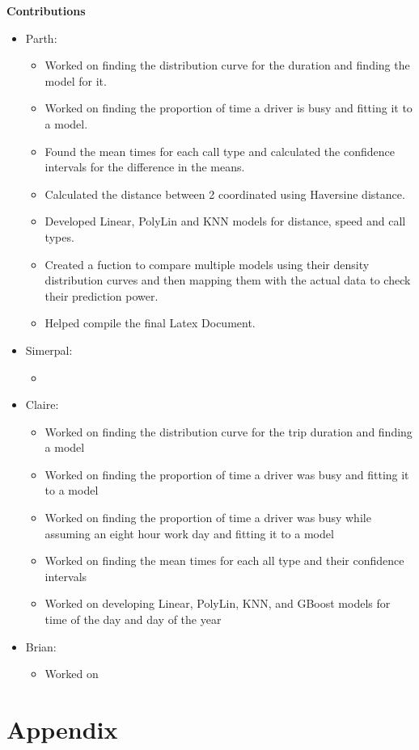 \documentclass[11pt]{article}
\begin{document}
\textbf{Contributions}
\begin{itemize}
	\item Parth: \begin{itemize}
		\item Worked on finding the distribution curve for the duration and finding the model for it.
		\item Worked on finding the proportion of time a driver is busy and fitting it to a model.
		\item Found the mean times for each call type and calculated the confidence intervals for the difference in the means.
		\item Calculated the distance between 2 coordinated using Haversine distance.
		\item Developed Linear, PolyLin and KNN models for distance, speed and call types. 
		\item Created a fuction to compare multiple models using their density distribution curves and then mapping them with the actual data to check their prediction power.
		\item Helped compile the final Latex Document.
	\end{itemize}
	\item Simerpal: \begin{itemize}
		\item
	\end{itemize}
	\item Claire: \begin{itemize}
		\item Worked on finding the distribution curve for the trip duration and finding a model 
		\item Worked on finding the proportion of time a driver was busy and fitting it to a model
		\item Worked on finding the proportion of time a driver was busy while assuming an eight hour work day and fitting it to a model
		\item Worked on finding the mean times for each all type and their confidence intervals
		\item Worked on developing Linear, PolyLin, KNN, and GBoost models for time of the day and day of the year
	\end{itemize}
	\item Brian:\begin{itemize}
		\item Worked on
	\end{itemize}
\end{itemize}

\appendix
\section*{Appendix}

\end{document}
